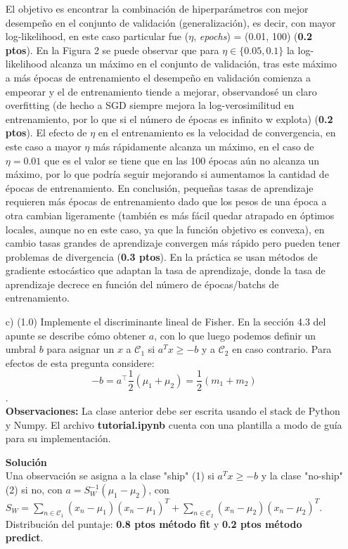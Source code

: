 \documentclass[11pt,letterpaper]{article}
\begin{document}
\begin{enumerate}
El objetivo es encontrar la combinación de hiperparámetros con mejor desempeño en el conjunto de validación (generalización), es decir, con mayor log-likelihood, en este caso particular fue ($\eta$, \textit{epochs}) = (0.01, 100) (\textbf{0.2 ptos}). En la Figura 2 se puede observar que para $\eta \in \{0.05, 0.1\}$ la log-likelihood alcanza un máximo en el conjunto de validación, tras este máximo a más épocas de entrenamiento el desempeño en validación comienza a empeorar y el de entrenamiento tiende a mejorar, observandosé un claro overfitting (de hecho a SGD siempre mejora la log-verosimilitud en entrenamiento, por lo que si el número de épocas es infinito w explota) (\textbf{0.2 ptos}). El efecto de $\eta$ en el entrenamiento es la velocidad de convergencia, en este caso a mayor $\eta$ más rápidamente alcanza un máximo, en el caso de $\eta = 0.01$ que es el valor se tiene que en las 100 épocas aún no alcanza un máximo, por lo que podría seguir mejorando si aumentamos la cantidad de épocas de entrenamiento. En conclusión, pequeñas tasas de aprendizaje requieren más épocas de entrenamiento dado que los pesos de una época a otra cambian ligeramente (también es más fácil quedar atrapado en óptimos locales, aunque no en este caso, ya que la función objetivo es convexa), en cambio tasas grandes de aprendizaje convergen más rápido pero pueden tener problemas de divergencia (\textbf{0.3 ptos}). En la práctica se usan métodos de gradiente estocástico que adaptan la tasa de aprendizaje, donde la tasa de aprendizaje decrece en función del número de épocas/batchs de entrenamiento.\\

\item [c)] (1.0) Implemente el discriminante lineal de Fisher. En la sección 4.3 del apunte se describe cómo obtener $a$, con lo que luego podemos definir un umbral $b$ para asignar un $x$ a $\mathcal{C}_{1}$ si $a^{T}x\geq-b$ y a $\mathcal{C}_{2}$ en caso contrario. Para efectos de esta pregunta considere:
\begin{equation*}
    -b=a^{\top}\frac{1}{2}(\mu_{1}+\mu_{2})=\frac{1}{2}(m_{1}+m_{2})
\end{equation*}.\\ 
\textbf{Observaciones:} La clase anterior debe ser escrita usando el stack de Python y Numpy. El archivo \textbf{tutorial.ipynb} cuenta con una plantilla a modo de guía para su implementación. 

\textbf{Solución}\\
Una observación se asigna a la clase "ship" (1) si $a^{T}x\geq -b$ y la clase "no-ship" (2) si no, con $a=S_{W}^{-1}(\mu_{1}-\mu_{2})$, con $S_W =\sum_{n\in \mathcal{C}_{1}}(x_{n}-\mu_{1})(x_{n}-\mu_{1})^{T}+\sum_{n\in \mathcal{C}_{2}}(x_{n}-\mu_{2})(x_{n}-\mu_{2})^{T}$. Distribución del puntaje: \textbf{0.8 ptos método fit} y \textbf{0.2 ptos método predict}.\\


\end{enumerate}
\end{document}
